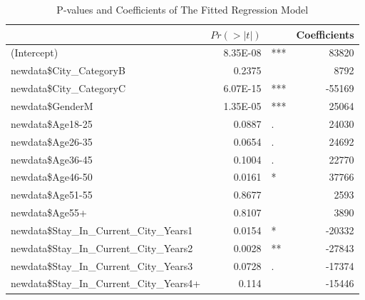 \documentclass[12pt]{article}
\begin{document}
\begin{table}[htbp]
	\centering
	\caption{P-values and Coefficients of The Fitted Regression Model}
    \begin{tabular}{lrrr}
    	\toprule[1.5pt]
	& \multicolumn{1}{l}{$Pr(>|t|)$} &       & \multicolumn{1}{l}{Coefficients} \\
	\hline
	(Intercept) & 8.35E-08 & \multicolumn{1}{l}{***} & 83820 \\
	newdata\$City\_CategoryB & 0.2375 &       & 8792 \\
	newdata\$City\_CategoryC & 6.07E-15 & \multicolumn{1}{l}{***} & -55169 \\
	newdata\$GenderM & 1.35E-05 & \multicolumn{1}{l}{***} & 25064 \\
	newdata\$Age18-25 & 0.0887 & \multicolumn{1}{l}{.} & 24030 \\
	newdata\$Age26-35 & 0.0654 & \multicolumn{1}{l}{.} & 24692 \\
	newdata\$Age36-45 & 0.1004 & \multicolumn{1}{l}{.} & 22770 \\
	newdata\$Age46-50 & 0.0161 & \multicolumn{1}{l}{*} & 37766 \\
	newdata\$Age51-55 & 0.8677 &       & 2593 \\
	newdata\$Age55+ & 0.8107 &       & 3890 \\
	newdata\$Stay\_In\_Current\_City\_Years1 & 0.0154 & \multicolumn{1}{l}{*} & -20332 \\
	newdata\$Stay\_In\_Current\_City\_Years2 & 0.0028 & \multicolumn{1}{l}{**} & -27843 \\
	newdata\$Stay\_In\_Current\_City\_Years3 & 0.0728 & \multicolumn{1}{l}{.} & -17374 \\
	newdata\$Stay\_In\_Current\_City\_Years4+ & 0.114 &       & -15446 \\
	\toprule[1.5pt]
\end{tabular}%
	\label{fitted model}%
\end{table}
	
\end{document}
